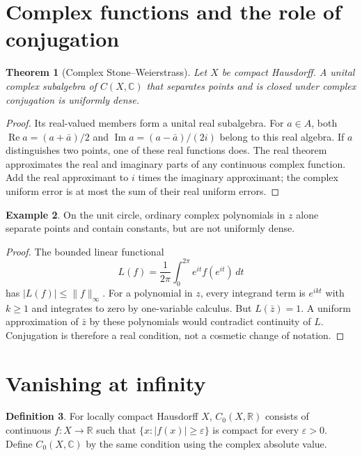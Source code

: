 \documentclass[11pt,oneside,openany]{book}
\newtheorem{theorem}{Theorem}[chapter]
\theoremstyle{definition}
\newtheorem{definition}[theorem]{Definition}
\newtheorem{example}[theorem]{Example}
\theoremstyle{remark}
\newcommand{\R}{\mathbb R}\newcommand{\C}{\mathbb C}
\newcommand{\eps}{\varepsilon}
\newcommand{\norm}[1]{\lVert#1\rVert}
\begin{document}
\section{Complex functions and the role of conjugation}
\begin{theorem}[Complex Stone--Weierstrass]\label{d10:16:stone-weierstrass-complex}
Let $X$ be compact Hausdorff. A unital complex subalgebra of $C(X,\C)$
that separates points and is closed under complex conjugation is uniformly dense.
\end{theorem}
\begin{proof}
Its real-valued members form a unital real subalgebra.
For $a\in A$, both $\operatorname{Re}a=(a+\bar a)/2$ and
$\operatorname{Im}a=(a-\bar a)/(2i)$ belong to this real algebra.
If $a$ distinguishes two points, one of these real functions does.
The real theorem approximates the real and imaginary parts of any
continuous complex function. Add the real approximant to $i$ times
the imaginary approximant; the complex uniform error is at most the
sum of their real uniform errors.
\end{proof}

\begin{example}\label{d10:16:conjugation-needed}
On the unit circle, ordinary complex polynomials in $z$ alone separate
points and contain constants, but are not uniformly dense.
\end{example}
\begin{proof}
The bounded linear functional
\[
 L(f)=\frac1{2\pi}\int_0^{2\pi}e^{it}f(e^{it})\,dt
\]
has $|L(f)|\leq\norm{f}_\infty$. For a polynomial in $z$, every
integrand term is $e^{ikt}$ with $k\geq1$ and integrates to zero by
one-variable calculus. But $L(\bar z)=1$. A uniform approximation
of $\bar z$ by these polynomials would contradict continuity of $L$.
Conjugation is therefore a real condition, not a cosmetic change of notation.
\end{proof}

\section{Vanishing at infinity}
\begin{definition}\label{d10:16:c0}
For locally compact Hausdorff $X$, $C_0(X,\R)$ consists of continuous
$f:X\to\R$ such that $\{x:|f(x)|\geq\eps\}$ is compact for every $\eps>0$.
Define $C_0(X,\C)$ by the same condition using the complex absolute value.
\end{definition}
\end{document}
